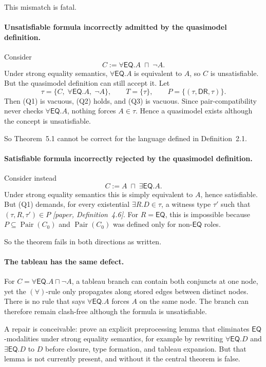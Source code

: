 \documentclass[11pt]{article}
\newcommand{\Paper}[1]{\textit{[paper, #1]}}
\newcommand{\role}[1]{\ensuremath{\mathsf{#1}}}
\newcommand{\DR}{\role{DR}}
\newcommand{\EQ}{\role{EQ}}
\newcommand{\Pair}{\operatorname{Pair}}
\begin{document}
This mismatch is fatal.

\paragraph{Unsatisfiable formula incorrectly admitted by the quasimodel definition.}
Consider
\[
C := \forall \EQ.A \;\sqcap\; \neg A.
\]
Under strong equality semantics, $\forall \EQ.A$ is equivalent to $A$, so $C$ is unsatisfiable. But the quasimodel definition can still accept it. Let
\[
\tau = \{C,\; \forall \EQ.A,\; \neg A\}, \qquad T = \{\tau\}, \qquad P = \{(\tau,\DR,\tau)\}.
\]
Then (Q1) is vacuous, (Q2) holds, and (Q3) is vacuous. Since pair-compatibility never checks $\forall \EQ.A$, nothing forces $A \in \tau$. Hence a quasimodel exists although the concept is unsatisfiable.

So Theorem~5.1 cannot be correct for the language defined in Definition~2.1.

\paragraph{Satisfiable formula incorrectly rejected by the quasimodel definition.}
Consider instead
\[
C := A \;\sqcap\; \exists \EQ.A.
\]
Under strong equality semantics this is simply equivalent to $A$, hence satisfiable. But (Q1) demands, for every existential $\exists R.D \in \tau$, a witness type $\tau'$ such that $(\tau,R,\tau') \in P$ \Paper{Definition~4.6}. For $R=\EQ$, this is impossible because $P \subseteq \Pair(C_0)$ and $\Pair(C_0)$ was defined only for non-$\EQ$ roles.

So the theorem fails in both directions as written.

\paragraph{The tableau has the same defect.}
For $C = \forall \EQ.A \sqcap \neg A$, a tableau branch can contain both conjuncts at one node, yet the $(\forall)$-rule only propagates along stored edges between distinct nodes. There is no rule that says $\forall \EQ.A$ forces $A$ on the same node. The branch can therefore remain clash-free although the formula is unsatisfiable.

A repair is conceivable: prove an explicit preprocessing lemma that eliminates $\EQ$-modalities under strong equality semantics, for example by rewriting $\forall \EQ.D$ and $\exists \EQ.D$ to $D$ before closure, type formation, and tableau expansion. But that lemma is not currently present, and without it the central theorem is false.
\end{document}
